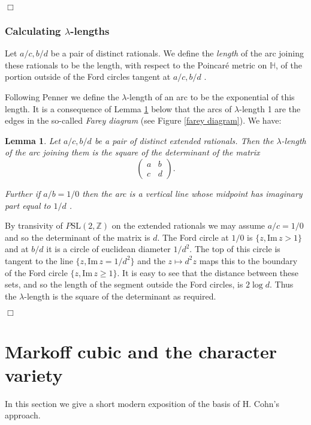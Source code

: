 \documentclass[12pt,a4paper]{amsart}
\newtheorem{lem}[thm]{Lemma}
\def\HH{\mathbb{H}}
\def\im{\mathrm{Im}\,}
\def\ZZ{\mathbb{Z}}
\def\sl2{\mathrm{SL}(2, \ZZ)}
\begin{document}
\hfill $\Box$

\subsubsection{Calculating $\lambda$-lengths}

Let $a/c, b/d$ be a pair of distinct rationals.
We define the \textit{length} of the arc 
joining these rationals 
to be the length, with respect to the Poincar\'e metric on $\HH$, 
of the portion  outside of the Ford circles tangent at $a/c, b/d$ .


Following Penner \cite{bob} we define the
$\lambda$-length of an arc to be the exponential of this 
length.
 It is a consequence  of Lemma \ref{calcul} below  that the arcs of $\lambda$-length 1 are the edges in the so-called 
\textit{Farey diagram} (see Figure \ref{farey diagram}).
We have:

\begin{lem}\label{calcul}
Let $a/c, b/d$ be a pair of distinct extended rationals.
Then the  $\lambda$-length of the arc joining them
 is the square of the determinant of the matrix
$$\begin{pmatrix}
a & b \\ c & d
\end{pmatrix}.$$

Further if $a/b = 1/0$ then the arc is a vertical line 
 whose midpoint has imaginary part equal to $1/d$ .
\end{lem}

\proof 
By transivity of $P\sl2$ on the extended rationals we may assume 
$a/c = 1/0$ and so the determinant of the matrix is $d$.
The Ford circle at $1/0$  is $\{ z, \im z > 1\}$ and
at $b/d$ it is a circle of euclidean diameter $1/d^2$.
The top of this circle is tangent to the line $\{ z, \im z = 1/d^2\}$
and the $z \mapsto d^2 z $ maps this to the boundary 
of the Ford circle $\{ z, \im z \geq 1\}$.
It is easy to see that the distance between these sets,
and so the length of the segment outside the Ford circles,
is $2\log d$. Thus the $\lambda$-length is the square of the 
determinant as required.

\hfill $\Box$


 
\section{Markoff cubic and the character variety}

In this section we give a short modern exposition of the basis of H. Cohn's
approach.
\end{document}
